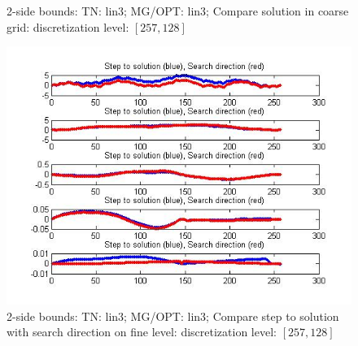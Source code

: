 \documentclass[10pt]{article}
\begin{document}
\begin{figure}[H]
  \centering
  \caption{2-side bounds: TN: lin3; MG/OPT: lin3; Compare solution in coarse grid: discretization level: $[257,128]$}
  \label{fig:coarse33}
\end{figure}

\begin{figure}
  \centering
  \includegraphics[width=1\textwidth]{finedirvs25733}
  \caption{2-side bounds: TN: lin3; MG/OPT: lin3; Compare step to solution with search direction on fine level: discretization level: $[257,128]$}
  \label{fig:fine}
\end{figure}
\end{document}
